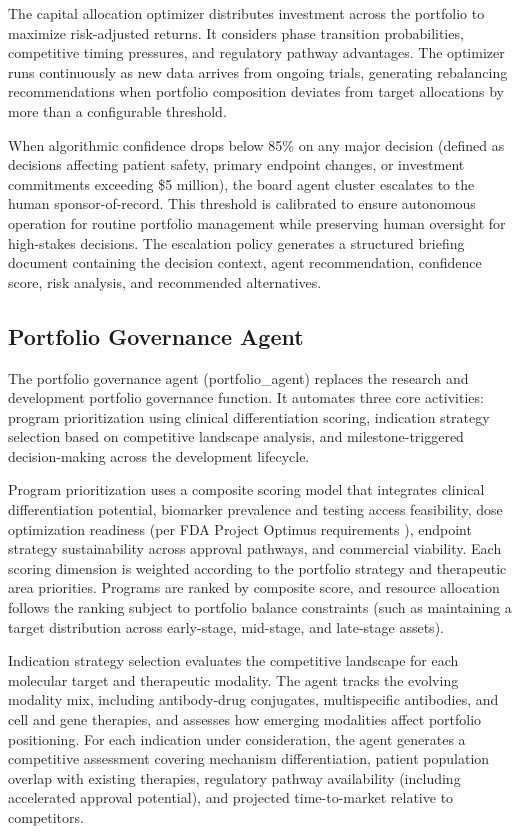 The capital allocation optimizer distributes investment across the portfolio to maximize
risk-adjusted returns. It considers phase transition probabilities, competitive timing
pressures, and regulatory pathway advantages. The optimizer runs continuously as new data
arrives from ongoing trials, generating rebalancing recommendations when portfolio
composition deviates from target allocations by more than a configurable threshold.

When algorithmic confidence drops below 85\% on any major decision (defined as decisions
affecting patient safety, primary endpoint changes, or investment commitments exceeding
\$5 million), the board agent cluster escalates to the human sponsor-of-record. This
threshold is calibrated to ensure autonomous operation for routine portfolio management
while preserving human oversight for high-stakes decisions. The escalation policy
generates a structured briefing document containing the decision context, agent
recommendation, confidence score, risk analysis, and recommended alternatives.

\subsection{Portfolio Governance Agent}

The portfolio governance agent (portfolio\_agent) replaces the research and development
portfolio governance function. It automates three core activities: program prioritization
using clinical differentiation scoring, indication strategy selection based on competitive
landscape analysis, and milestone-triggered decision-making across the development lifecycle.

Program prioritization uses a composite scoring model that integrates clinical differentiation
potential, biomarker prevalence and testing access feasibility, dose optimization readiness
(per FDA Project Optimus requirements \cite{fda-project-optimus}), endpoint strategy
sustainability across approval pathways, and commercial viability. Each scoring dimension is
weighted according to the portfolio strategy and therapeutic area priorities. Programs are
ranked by composite score, and resource allocation follows the ranking subject to portfolio
balance constraints (such as maintaining a target distribution across early-stage, mid-stage,
and late-stage assets).

Indication strategy selection evaluates the competitive landscape for each molecular target
and therapeutic modality. The agent tracks the evolving modality mix, including antibody-drug
conjugates, multispecific antibodies, and cell and gene therapies, and assesses how emerging
modalities affect portfolio positioning. For each indication under consideration, the agent
generates a competitive assessment covering mechanism differentiation, patient population
overlap with existing therapies, regulatory pathway availability (including accelerated
approval potential), and projected time-to-market relative to competitors.

